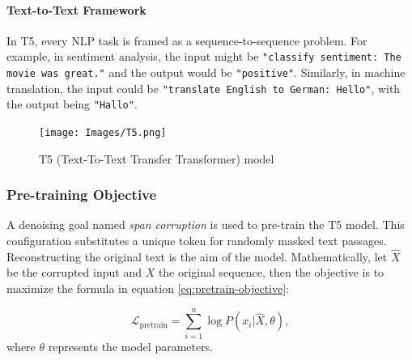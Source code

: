 \documentclass{dhbenelux}
\begin{document}
\paragraph{Text-to-Text Framework}
In T5, every NLP task is framed as a sequence-to-sequence problem. For example, in sentiment analysis, the input might be \texttt{"classify sentiment: The movie was great."} and the output would be \texttt{"positive"}. Similarly, in machine translation, the input could be \texttt{"translate English to German: Hello"}, with the output being \texttt{"Hallo"}.

\begin{figure}[h]
\centering
\texttt{[image: Images/T5.png]}
\caption{T5 (Text-To-Text Transfer Transformer) model}
\label{fig:t5-model}
\end{figure}

\subsubsection{Pre-training Objective}
A denoising goal named \textit{span corruption} is used to pre-train the T5 model. This configuration substitutes a unique token for randomly masked text passages. Reconstructing the original text is the aim of the model. Mathematically, let \( \hat{X} \) be the corrupted input and \( X \) the original sequence, then the objective is to maximize the formula in equation \ref{eq:pretrain-objective}:

\begin{equation}
\mathcal{L}_{\text{pretrain}} = \sum_{i=1}^n \log P(x_i | \hat{X}, \theta),
\label{eq:pretrain-objective}
\end{equation}
where \( \theta \) represents the model parameters.
\end{document}
